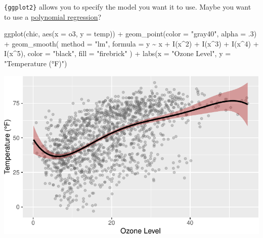 \documentclass[
  letterpaper,
]{scrbook}
\newenvironment{Shaded}{\begin{snugshade}}{\end{snugshade}}
\newcommand{\AttributeTok}[1]{\textcolor[rgb]{0.40,0.45,0.13}{#1}}
\newcommand{\DecValTok}[1]{\textcolor[rgb]{0.68,0.00,0.00}{#1}}
\newcommand{\FunctionTok}[1]{\textcolor[rgb]{0.28,0.35,0.67}{#1}}
\newcommand{\NormalTok}[1]{\textcolor[rgb]{0.00,0.23,0.31}{#1}}
\newcommand{\SpecialCharTok}[1]{\textcolor[rgb]{0.37,0.37,0.37}{#1}}
\newcommand{\StringTok}[1]{\textcolor[rgb]{0.13,0.47,0.30}{#1}}
\begin{document}
\texttt{\{ggplot2\}} allows you to specify the model you want it to use.
Maybe you want to use a
\href{https://en.wikipedia.org/wiki/Polynomial_regression}{polynomial
regression}?

\begin{Shaded}
\begin{Highlighting}[]
\FunctionTok{ggplot}\NormalTok{(chic, }\FunctionTok{aes}\NormalTok{(}\AttributeTok{x =}\NormalTok{ o3, }\AttributeTok{y =}\NormalTok{ temp)) }\SpecialCharTok{+}
  \FunctionTok{geom\_point}\NormalTok{(}\AttributeTok{color =} \StringTok{"gray40"}\NormalTok{, }\AttributeTok{alpha =}\NormalTok{ .}\DecValTok{3}\NormalTok{) }\SpecialCharTok{+}
  \FunctionTok{geom\_smooth}\NormalTok{(}
    \AttributeTok{method =} \StringTok{"lm"}\NormalTok{,}
    \AttributeTok{formula =}\NormalTok{ y }\SpecialCharTok{\textasciitilde{}}\NormalTok{ x }\SpecialCharTok{+} \FunctionTok{I}\NormalTok{(x}\SpecialCharTok{\^{}}\DecValTok{2}\NormalTok{) }\SpecialCharTok{+} \FunctionTok{I}\NormalTok{(x}\SpecialCharTok{\^{}}\DecValTok{3}\NormalTok{) }\SpecialCharTok{+} \FunctionTok{I}\NormalTok{(x}\SpecialCharTok{\^{}}\DecValTok{4}\NormalTok{) }\SpecialCharTok{+} \FunctionTok{I}\NormalTok{(x}\SpecialCharTok{\^{}}\DecValTok{5}\NormalTok{),}
    \AttributeTok{color =} \StringTok{"black"}\NormalTok{,}
    \AttributeTok{fill =} \StringTok{"firebrick"}
\NormalTok{  ) }\SpecialCharTok{+}
  \FunctionTok{labs}\NormalTok{(}\AttributeTok{x =} \StringTok{"Ozone Level"}\NormalTok{, }\AttributeTok{y =} \StringTok{"Temperature (°F)"}\NormalTok{)}
\end{Highlighting}
\end{Shaded}

\includegraphics{ch17_files/figure-pdf/GAM-spec1-1.pdf}
\end{document}
